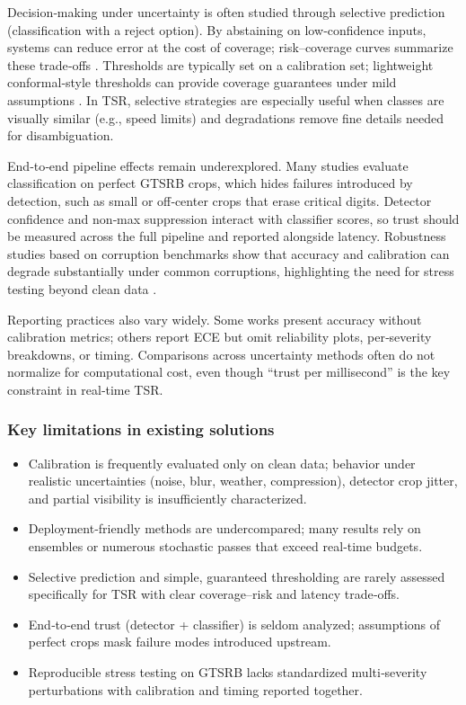 \documentclass[11pt,a4paper]{article}
\begin{document}
Decision‑making under uncertainty is often studied through selective prediction (classification with a reject option). By abstaining on low‑confidence inputs, systems can reduce error at the cost of coverage; risk–coverage curves summarize these trade‑offs \cite{geifman2019selectivenet}. Thresholds are typically set on a calibration set; lightweight conformal‑style thresholds can provide coverage guarantees under mild assumptions \cite{vovk2005algorithmic}. In TSR, selective strategies are especially useful when classes are visually similar (e.g., speed limits) and degradations remove fine details needed for disambiguation.

End‑to‑end pipeline effects remain underexplored. Many studies evaluate classification on perfect GTSRB crops, which hides failures introduced by detection, such as small or off‑center crops that erase critical digits. Detector confidence and non‑max suppression interact with classifier scores, so trust should be measured across the full pipeline and reported alongside latency. Robustness studies based on corruption benchmarks show that accuracy and calibration can degrade substantially under common corruptions, highlighting the need for stress testing beyond clean data \cite{hendrycks2019imagenetc}.

Reporting practices also vary widely. Some works present accuracy without calibration metrics; others report ECE but omit reliability plots, per‑severity breakdowns, or timing. Comparisons across uncertainty methods often do not normalize for computational cost, even though “trust per millisecond” is the key constraint in real‑time TSR.

\subsubsection*{Key limitations in existing solutions}

\begin{itemize}
  \item Calibration is frequently evaluated only on clean data; behavior under realistic uncertainties (noise, blur, weather, compression), detector crop jitter, and partial visibility is insufficiently characterized.
  \item Deployment‑friendly methods are undercompared; many results rely on ensembles or numerous stochastic passes that exceed real‑time budgets.
  \item Selective prediction and simple, guaranteed thresholding are rarely assessed specifically for TSR with clear coverage–risk and latency trade‑offs.
  \item End‑to‑end trust (detector + classifier) is seldom analyzed; assumptions of perfect crops mask failure modes introduced upstream.
  \item Reproducible stress testing on GTSRB lacks standardized multi‑severity perturbations with calibration and timing reported together.
\end{itemize}
\end{document}
